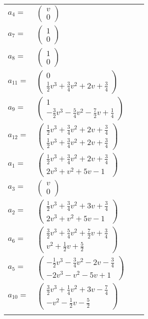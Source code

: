 \documentclass[1p]{elsarticle_modified}
\theoremstyle{definition}
\begin{document}
\begin{tabular}{m{7pt} m{180pt} m{7pt} m{180pt} }
\flushright $a_{4}=$&$\begin{pmatrix}v\\0\end{pmatrix}$ \\
\flushright $a_{7}=$&$\begin{pmatrix}1\\0\end{pmatrix}$ \\
\flushright $a_{8}=$&$\begin{pmatrix}1\\0\end{pmatrix}$ \\
\flushright $a_{11}=$&$\begin{pmatrix}0\\\frac{1}{2} v^3+\frac{3}{4} v^2+2 v+\frac{3}{4}\end{pmatrix}$ \\
\flushright $a_{9}=$&$\begin{pmatrix}1\\-\frac{3}{2} v^3-\frac{5}{4} v^2-\frac{7}{2} v+\frac{1}{4}\end{pmatrix}$ \\
\flushright $a_{12}=$&$\begin{pmatrix}\frac{1}{2} v^3+\frac{3}{4} v^2+2 v+\frac{3}{4}\\\frac{1}{2} v^3+\frac{3}{4} v^2+2 v+\frac{3}{4}\end{pmatrix}$ \\
\flushright $a_{1}=$&$\begin{pmatrix}\frac{1}{2} v^3+\frac{3}{4} v^2+2 v+\frac{3}{4}\\2 v^3+v^2+5 v-1\end{pmatrix}$ \\
\flushright $a_{3}=$&$\begin{pmatrix}v\\0\end{pmatrix}$ \\
\flushright $a_{2}=$&$\begin{pmatrix}\frac{1}{2} v^3+\frac{3}{4} v^2+3 v+\frac{3}{4}\\2 v^3+v^2+5 v-1\end{pmatrix}$ \\
\flushright $a_{6}=$&$\begin{pmatrix}\frac{3}{2} v^3+\frac{5}{4} v^2+\frac{7}{2} v+\frac{3}{4}\\v^2+\frac{1}{2} v+\frac{5}{2}\end{pmatrix}$ \\
\flushright $a_{5}=$&$\begin{pmatrix}-\frac{1}{2} v^3-\frac{3}{4} v^2-2 v-\frac{3}{4}\\-2 v^3- v^2-5 v+1\end{pmatrix}$ \\
\flushright $a_{10}=$&$\begin{pmatrix}\frac{3}{2} v^3+\frac{1}{4} v^2+3 v-\frac{7}{4}\\- v^2-\frac{1}{2} v-\frac{5}{2}\end{pmatrix}$\\&\end{tabular}
\end{document}

